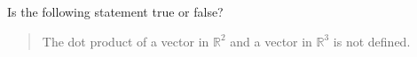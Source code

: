 \documentclass{ximera}
\author{Gregory Hartman \and Matthew Carr}
\begin{document}
\begin{exercise}



Is the following statement true or false?
\begin{quote}
The dot product of a vector in $\mathbb{R}^2$ and a vector in $\mathbb{R}^3$ is not defined.
\end{quote}

\begin{multipleChoice}
\end{multipleChoice}

\end{exercise}
\end{document}
